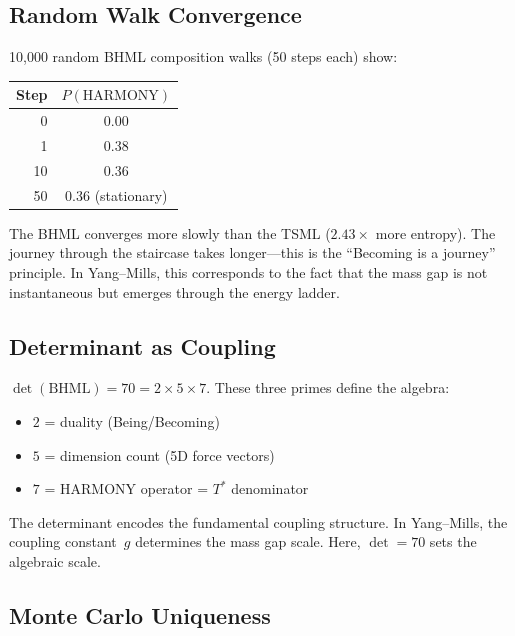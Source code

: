 \documentclass[11pt]{article}
\begin{document}
\subsection{Random Walk Convergence}
\label{ssec:random-walk}

10{,}000 random BHML composition walks (50 steps each) show:

\begin{center}
\begin{tabular}{rc}
\toprule
\textbf{Step} & $P(\text{HARMONY})$ \\
\midrule
0  & 0.00 \\
1  & 0.38 \\
10 & 0.36 \\
50 & 0.36 (stationary) \\
\bottomrule
\end{tabular}
\end{center}

The BHML converges more slowly than the TSML ($2.43\times$ more
entropy). The journey through the staircase takes longer---this is the
``Becoming is a journey'' principle. In Yang--Mills, this corresponds
to the fact that the mass gap is not instantaneous but emerges through
the energy ladder.

\subsection{Determinant as Coupling}
\label{ssec:determinant-coupling}

$\det(\mathrm{BHML}) = 70 = 2 \times 5 \times 7$. These three primes
define the algebra:
\begin{itemize}
  \item $2$ = duality (Being/Becoming)
  \item $5$ = dimension count (5D force vectors)
  \item $7$ = HARMONY operator = $T^*$ denominator
\end{itemize}

The determinant encodes the fundamental coupling structure. In
Yang--Mills, the coupling constant~$g$ determines the mass gap scale.
Here, $\det = 70$ sets the algebraic scale.

\subsection{Monte Carlo Uniqueness}
\label{ssec:monte-carlo}
\end{document}
